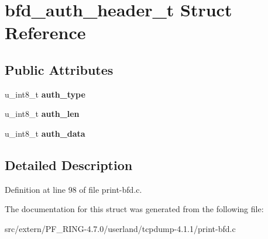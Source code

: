 \hypertarget{structbfd__auth__header__t}{
\section{bfd\_\-auth\_\-header\_\-t Struct Reference}
\label{structbfd__auth__header__t}
}
\subsection*{Public Attributes}
\begin{DoxyCompactItemize}
\item 
\hypertarget{structbfd__auth__header__t_ac520089fdf12a1dbd35f5ea2c671af70}{
u\_\-int8\_\-t {\bfseries auth\_\-type}}
\label{structbfd__auth__header__t_ac520089fdf12a1dbd35f5ea2c671af70}

\item 
\hypertarget{structbfd__auth__header__t_acc1edcb18d473ffe53f0a2e36eedf98b}{
u\_\-int8\_\-t {\bfseries auth\_\-len}}
\label{structbfd__auth__header__t_acc1edcb18d473ffe53f0a2e36eedf98b}

\item 
\hypertarget{structbfd__auth__header__t_ae88684999b29a7e5b5d944042e854d77}{
u\_\-int8\_\-t {\bfseries auth\_\-data}}
\label{structbfd__auth__header__t_ae88684999b29a7e5b5d944042e854d77}

\end{DoxyCompactItemize}


\subsection{Detailed Description}


Definition at line 98 of file print-\/bfd.c.



The documentation for this struct was generated from the following file:\begin{DoxyCompactItemize}
\item 
src/extern/PF\_\-RING-\/4.7.0/userland/tcpdump-\/4.1.1/print-\/bfd.c\end{DoxyCompactItemize}
